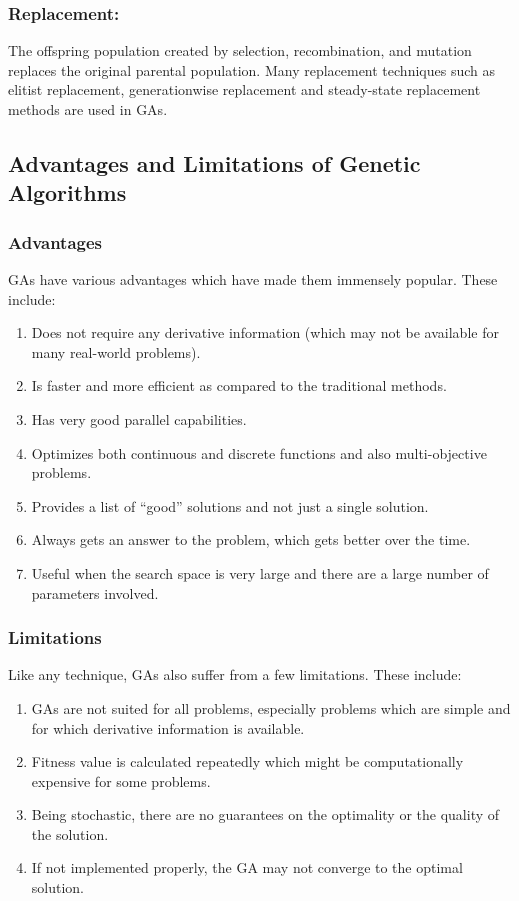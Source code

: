 \subsubsection{Replacement:}
The offspring population created by selection,
recombination, and mutation replaces the original parental population.
Many replacement techniques such as elitist replacement, generationwise replacement and steady-state replacement methods are used in
GAs.

\subsection{Advantages and Limitations of Genetic Algorithms}
\subsubsection{Advantages}
GAs have various advantages which have made them immensely popular. These include:
\begin{enumerate}
    \item{Does not require any derivative information (which may not be available for many real-world problems).}
    \item{Is faster and more efficient as compared to the traditional methods.}
    \item{Has very good parallel capabilities.}
    \item{Optimizes both continuous and discrete functions and also multi-objective problems.}
    \item{Provides a list of “good” solutions and not just a single solution.}
    \item{Always gets an answer to the problem, which gets better over the time.}
    \item{Useful when the search space is very large and there are a large number of parameters involved.}
\end{enumerate}
\subsubsection{Limitations}
Like any technique, GAs also suffer from a few limitations. These include:
\begin{enumerate}
    \item{GAs are not suited for all problems, especially problems which are simple and for which derivative information is available.}
    \item{Fitness value is calculated repeatedly which might be computationally expensive for some problems.}
    \item{Being stochastic, there are no guarantees on the optimality or the quality of the solution.}
    \item{If not implemented properly, the GA may not converge to the optimal solution.}
\end{enumerate}

